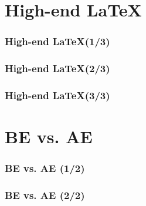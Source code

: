 \documentclass{beamer}
\begin{document}
\section{High-end \LaTeX}
\begin{frame}
\frametitle{High-end \LaTeX (1/3)}
\end{frame}
\begin{frame}
\frametitle{High-end \LaTeX (2/3)}
\end{frame}
\begin{frame}
\frametitle{High-end \LaTeX (3/3)}
\end{frame}


\section{BE vs. AE}
\begin{frame}
\frametitle{BE vs. AE (1/2)}
\end{frame}
\begin{frame}
\frametitle{BE vs. AE (2/2)}
\end{frame}
\end{document}
